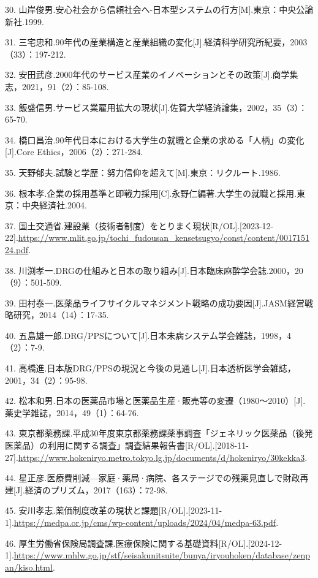30. 山岸俊男.安心社会から信頼社会へ-日本型システムの行方[M].東京：中央公論新社.1999.

31. 三宅忠和.90年代の産業構造と産業組織の変化[J].経済科学研究所紀要，2003（33）：197-212.

32. 安田武彦.2000年代のサービス産業のイノベーションとその政策[J].商学集志，2021，91（2）：85-108.

33. 飯盛信男.サービス業雇用拡大の現状[J].佐賀大学経済論集，2002，35（3）：65-70.

34. 橋口昌治.90年代日本における大学生の就職と企業の求める「人柄」の変化[J].Core Ethics，2006（2）：271-284.

35. 天野郁夫.試験と学歴：努力信仰を超えて[M].東京：リクルート.1986.

36. 根本孝.企業の採用基準と即戦力採用[C].永野仁編著.大学生の就職と採用.東京：中央経済社.2004.

37. 国土交通省.建設業（技術者制度）をとりまく現状[R/OL].\allowbreak{}[2023-12-22].\url{https://www.mlit.go.jp/tochi_fudousan_kensetsugyo/const/content/001715124.pdf}.

38. 川渕孝一.DRGの仕組みと日本の取り組み[J].日本臨床麻酔学会誌.2000，20（9）：501-509.

39. 田村泰一.医薬品ライフサイクルマネジメント戦略の成功要因[J].JASM経営戦略研究，2014（14）：17-35.

40. 五島雄一郎.DRG/PPSについて[J].日本未病システム学会雑誌，1998，4（2）：7-9.

41. 高橋進.日本版DRG/PPSの現況と今後の見通し[J].日本透析医学会雑誌，2001，34（2）：95-98.

42. 松本和男.日本の医薬品市場と医薬品生産·販売等の変遷（1980～2010）[J].薬史学雑誌，2014，49（1）：64-76.

43. 東京都薬務課.平成30年度東京都薬務課薬事調査「ジェネリック医薬品（後発医薬品）の利用に関する調査」調査結果報告書[R/OL].\allowbreak{}[2018-11-27].\url{https://www.hokeniryo.metro.tokyo.lg.jp/documents/d/hokeniryo/30kekka3}.

44. 星正彦.医療費削減—家庭·薬局·病院、各ステージでの残薬見直しで財政再建[J].経済のプリズム，2017（163）：72-98.

45. 安川孝志.薬価制度改革の現状と課題[R/OL].\allowbreak{}[2023-11-1].\url{https://medpa.or.jp/cms/wp-content/uploads/2024/04/medpa-63.pdf}.

46. 厚生労働省保険局調査課.医療保険に関する基礎資料[R/OL].\allowbreak{}[2024-12-1].\url{https://www.mhlw.go.jp/stf/seisakunitsuite/bunya/iryouhoken/database/zenpan/kiso.html}.

